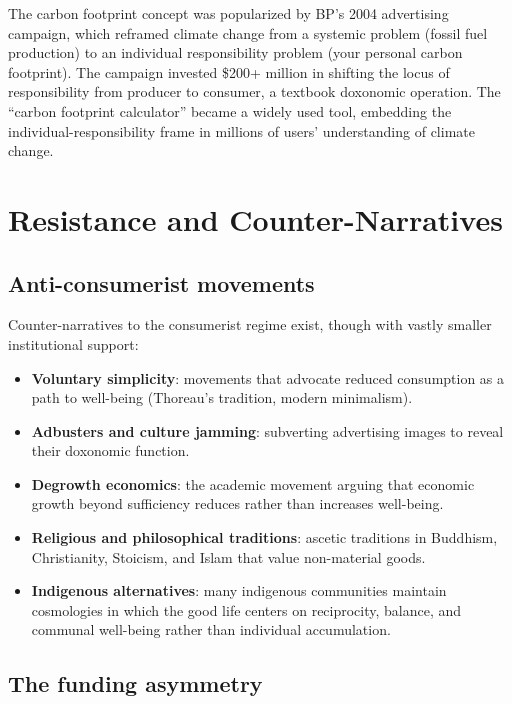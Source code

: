 \begin{example}
\label{ex:green-consumerism}
The carbon footprint concept was popularized by BP's 2004 advertising campaign, which reframed climate change from a systemic problem (fossil fuel production) to an individual responsibility problem (your personal carbon footprint).
The campaign invested \$200+ million in shifting the locus of responsibility from producer to consumer, a textbook doxonomic operation.
The ``carbon footprint calculator'' became a widely used tool, embedding the individual-responsibility frame in millions of users' understanding of climate change.
\end{example}

\section{Resistance and Counter-Narratives}
\label{sec:ch23-resistance}

\subsection{Anti-consumerist movements}

Counter-narratives to the consumerist regime exist, though with vastly smaller institutional support:
\begin{itemize}[nosep]
  \item \textbf{Voluntary simplicity}: movements that advocate reduced consumption as a path to well-being (Thoreau's tradition, modern minimalism).
  \item \textbf{Adbusters and culture jamming}: subverting advertising images to reveal their doxonomic function.
  \item \textbf{Degrowth economics}: the academic movement arguing that economic growth beyond sufficiency reduces rather than increases well-being.
  \item \textbf{Religious and philosophical traditions}: ascetic traditions in Buddhism, Christianity, Stoicism, and Islam that value non-material goods.
  \item \textbf{Indigenous alternatives}: many indigenous communities maintain cosmologies in which the good life centers on reciprocity, balance, and communal well-being rather than individual accumulation.
\end{itemize}

\subsection{The funding asymmetry}

